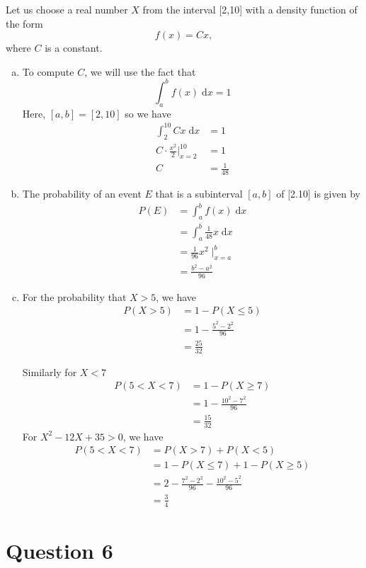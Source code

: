 \documentclass[11pt, oneside]{article}   	%
\begin{document}
Let us choose a real number $X$ from the interval [2,10] with a density function of the form
$$f(x) = Cx,$$
where $C$ is a constant.
\begin{enumerate}[(a)]
	\item To compute $C$, we will use the fact that 
	$$\int_a^b f(x)  \; \mathrm{d}x = 1$$	
	Here, $[a,b] = [2,10]$ so we have
	\begin{align*}
		\int_2^{10} Cx\;\mathrm{d}x & = 1 \\
		C \cdot \frac{x^2}{2} \Big|_{x=2}^{10} & = 1 \\
		C & = \frac{1}{48}
	\end{align*}
	
	
	\item The probability of an event $E$ that is a subinterval $[a,b]$ of [2.10] is given by
	\begin{align*}
		P(E) & = \int_a^b f(x) \; \mathrm{d}x \\
		& = \int_a^b \frac{1}{48}x \; \mathrm{d}x \\
		& = \frac{1}{96} x^2 \; \Big|_{x=a}^b \\
		& = \frac{b^2-a^2}{96}
	\end{align*}
	
	\item For the probability that $X>5$, we have
	\begin{align*}
		P(X>5) & = 1 - P(X \leq 5) \\
		& = 1 - \frac{5^2-2^2}{96} \\
		& = \frac{25}{32}
	\end{align*}
		
	
	Similarly for $X < 7$
	\begin{align*}
		P(5 < X < 7) & = 1 - P(X \geq 7) \\
		& = 1 - \frac{10^2-7^2}{96} \\
		& = \frac{15}{32}
	\end{align*}
	For $X^2-12X+35>0$, we have
	\begin{align*}
		P(5 < X < 7) & = P(X > 7) + P(X<5) \\
		& = 1 - P(X \leq 7) + 1 - P(X \geq 5) \\
		& = 2 - \frac{7^2-2^2}{96} - \frac{10^2-5^2}{96} \\
		& = \frac{3}{4}
	\end{align*}
\end{enumerate}

\section*{Question 6}
\end{document}
